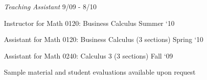 \documentclass[10pt]{article}
\newlength{\footpageshift}
\newenvironment{outerlist}[1][\enskip\textbullet]%
        {\begin{itemize}[#1]}{\end{itemize}%
         \vspace{-.6\baselineskip}}
\newenvironment{innerlist}[1][\enskip\textbullet]%
        {\begin{compactitem}[#1]}{\end{compactitem}}
\begin{document}
\begin{outerlist}
\begin{innerlist}[-]
      
    \end{innerlist}

\item[] \textit{Teaching Assistant}%
    \hspace{\footpageshift} \textrm{9/09 - 8/10}
    \begin{innerlist}[-]
        \item Instructor for Math 0120: Business Calculus \hfill Summer `10

        \item Assistant for Math 0120:  Business Calculus (3 sections)  \hfill Spring `10 

               \item Assistant for Math 0240:  Calculus 3 (3 sections) \hfill Fall `09 

            

       
        \end{innerlist}
        
 Sample material and student evaluations available upon
    request


\end{outerlist}
\end{document}
